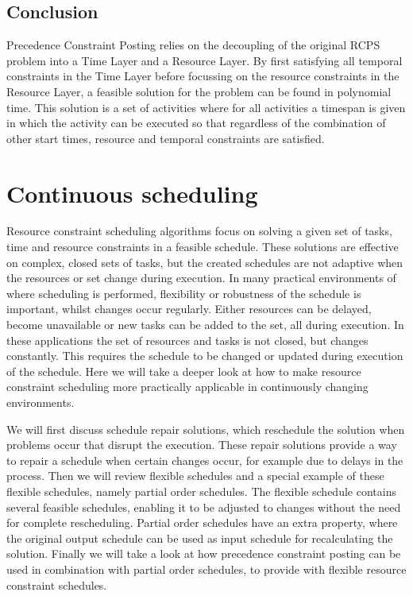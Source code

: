 \documentclass{article}
\begin{document}
\subsection{Conclusion}
Precedence Constraint Posting relies on the decoupling of the original RCPS problem into a Time Layer and a Resource Layer. By first satisfying all temporal constraints in the Time Layer before focussing on the resource constraints in the Resource Layer, a feasible solution for the problem can be found in polynomial time. This solution is a set of activities where for all activities a timespan is given in which the activity can be executed so that regardless of the combination of other start times, resource and temporal constraints are satisfied.

\newpage

\section{Continuous scheduling}
\label{section:continuous}
Resource constraint scheduling algorithms focus on solving a given set of tasks, time and resource constraints in a feasible schedule.
These solutions are effective on complex, closed sets of tasks, but the created schedules are not adaptive when the resources or set change during execution.
In many practical environments of where scheduling is performed, flexibility or robustness of the schedule is important, whilst changes occur regularly.
Either resources can be delayed, become unavailable or new tasks can be added to the set, all during execution.
In these applications the set of resources and tasks is not closed, but changes constantly.
This requires the schedule to be changed or updated during execution of the schedule.
Here we will take a deeper look at how to make resource constraint scheduling more practically applicable in continuously changing environments.

We will first discuss schedule repair solutions, which reschedule the solution when problems occur that disrupt the execution.
These repair solutions provide a way to repair a schedule when certain changes occur, for example due to delays in the process.
Then we will review flexible schedules and a special example of these flexible schedules, namely partial order schedules.
The flexible schedule contains several feasible schedules, enabling it to be adjusted to changes without the need for complete rescheduling.
Partial order schedules have an extra property, where the original output schedule can be used as input schedule for recalculating the solution.
Finally we will take a look at how precedence constraint posting can be used in combination with partial order schedules, to provide with flexible resource constraint schedules.
\end{document}
